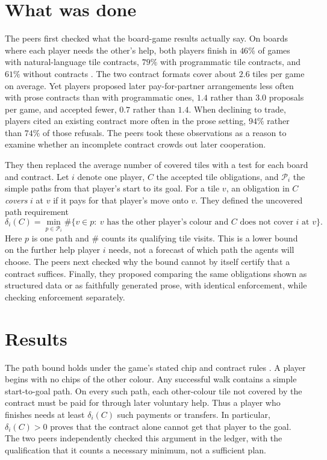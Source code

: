 \documentclass{article}
\begin{document}
\section{What was done}

The peers first checked what the board-game results actually say. On boards where each player needs the
other's help, both players finish in \(46\%\) of games with natural-language tile contracts, \(79\%\) with
programmatic tile contracts, and \(61\%\) without contracts \cite{P}. The two contract formats cover about
\(2.6\) tiles per game on average. Yet players proposed later pay-for-partner arrangements less often with
prose contracts than with programmatic ones, \(1.4\) rather than \(3.0\) proposals per game, and accepted
fewer, \(0.7\) rather than \(1.4\). When declining to trade, players cited an existing contract more often in
the prose setting, \(94\%\) rather than \(74\%\) of those refusals. The peers took these observations as a
reason to examine whether an incomplete contract crowds out later cooperation.

They then replaced the average number of covered tiles with a test for each board and contract. Let \(i\)
denote one player, \(C\) the accepted tile obligations, and \(\mathcal P_i\) the simple paths from that
player's start to its goal. For a tile \(v\), an obligation in \(C\) \emph{covers} \(i\) at \(v\) if it pays
for that player's move onto \(v\). They defined the uncovered path requirement
\[
\delta_i(C)=\min_{p\in\mathcal P_i}
\#\{v\in p:\ v\text{ has the other player's colour and }C
\text{ does not cover }i\text{ at }v\}.
\]
Here \(p\) is one path and \(\#\) counts its qualifying tile visits. This is a lower bound on the further help
player \(i\) needs, not a forecast of which path the agents will choose. The peers next checked why the bound
cannot by itself certify that a contract suffices. Finally, they proposed comparing the same obligations shown
as structured data or as faithfully generated prose, with identical enforcement, while checking enforcement
separately.

\section{Results}
\enlargethispage{3\baselineskip}

The path bound holds under the game's stated chip and contract rules \cite{P}. A player begins with no chips
of the other colour. Any successful walk contains a simple start-to-goal path. On every such path, each
other-colour tile not covered by the contract must be paid for through later voluntary help. Thus a player who
finishes needs at least \(\delta_i(C)\) such payments or transfers. In particular, \(\delta_i(C)>0\) proves
that the contract alone cannot get that player to the goal. The two peers independently checked this argument
in the ledger, with the qualification that it counts a necessary minimum, not a sufficient plan.
\end{document}
